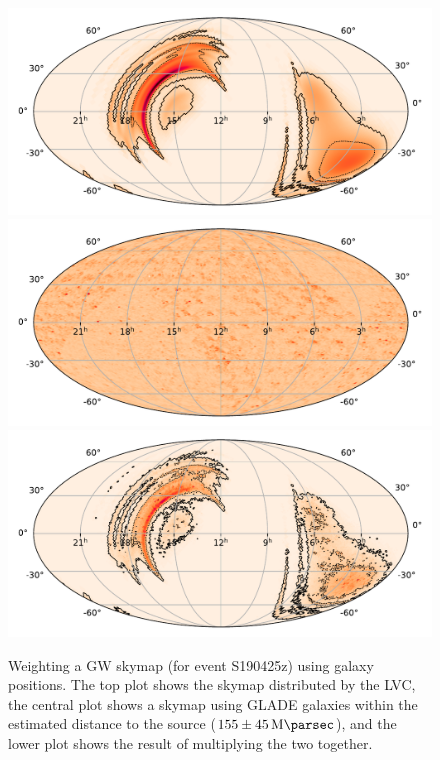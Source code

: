 \begin{colsection}
\begin{figure}[p]
    \begin{center}
        \includegraphics[width=0.8\linewidth]{images/tiling/gal_before.pdf}
        \includegraphics[width=0.8\linewidth]{images/tiling/gal.pdf}
        \includegraphics[width=0.8\linewidth]{images/tiling/gal_after.pdf}
    \end{center}
    \caption[Weighting a GW skymap using galaxy positions]{
        Weighting a GW skymap (for event S190425z) using galaxy positions. The top plot shows the skymap distributed by the LVC, the central plot shows a skymap using GLADE galaxies within the estimated distance to the source ($155\pm\SI{45}{\mega\parsec}$), and the lower plot shows the result of multiplying the two together.
    }\label{fig:galaxy_skymap}
\end{figure}

\end{colsection}


